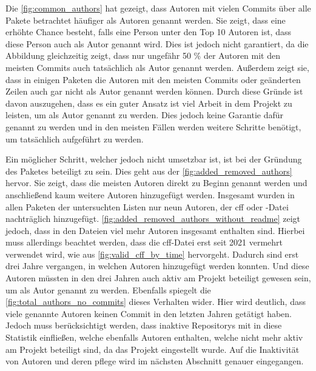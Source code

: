 Die \autoref{fig:common_authors} hat gezeigt, dass Autoren mit vielen Commits über alle Pakete betrachtet häufiger als Autoren genannt werden.
Sie zeigt, dass eine erhöhte Chance besteht, falls eine Person unter den Top 10 Autoren ist, dass diese Person auch als Autor genannt wird.
Dies ist jedoch nicht garantiert, da die Abbildung gleichzeitig zeigt, dass nur ungefähr 50 \% der Autoren mit den meisten Commits auch tatsächlich als Autor genannt werden.
Außerdem zeigt sie, dass in einigen Paketen die Autoren mit den meisten Commits oder geänderten Zeilen auch gar nicht als Autor genannt werden können.
Durch diese Gründe ist davon auszugehen, dass es ein guter Ansatz ist viel Arbeit in dem Projekt zu leisten, um als Autor genannt zu werden.
Dies jedoch keine Garantie dafür genannt zu werden und in den meisten Fällen werden weitere Schritte benötigt, um tatsächlich aufgeführt zu werden.

Ein möglicher Schritt, welcher jedoch nicht umsetzbar ist, ist bei der Gründung des Paketes beteiligt zu sein.
Dies geht aus der \autoref{fig:added_removed_authors} hervor.
Sie zeigt, dass die meisten Autoren direkt zu Beginn genannt werden und anschließend kaum weitere Autoren hinzugefügt werden.
Insgesamt wurden in allen Paketen der untersuchten Listen nur neun Autoren, der \gls{cff} oder -Datei nachträglich hinzugefügt.
\autoref{fig:added_removed_authors_without_readme} zeigt jedoch, dass in den Dateien viel mehr Autoren insgesamt enthalten sind.
Hierbei muss allerdings beachtet werden, dass die \gls{cff}-Datei erst seit 2021 vermehrt verwendet wird, wie aus \autoref{fig:valid_cff_by_time} hervorgeht.
Dadurch sind erst drei Jahre vergangen, in welchen Autoren hinzugefügt werden konnten.
Und diese Autoren müssten in den drei Jahren auch aktiv am Projekt beteiligt gewesen sein, um als Autor genannt zu werden.
Ebenfalls spiegelt die \autoref{fig:total_authors_no_commits} dieses Verhalten wider.
Hier wird deutlich, dass viele genannte Autoren keinen Commit in den letzten Jahren getätigt haben.
Jedoch muss berücksichtigt werden, dass inaktive Repositorys mit in diese Statistik einfließen, welche ebenfalls Autoren enthalten, welche nicht mehr aktiv am Projekt beteiligt sind, da das Projekt eingestellt wurde.
Auf die Inaktivität von Autoren und deren pflege wird im nächsten Abschnitt genauer eingegangen.

